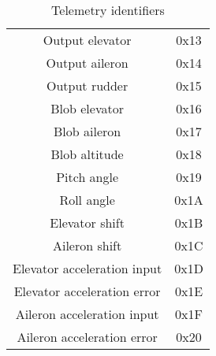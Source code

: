 \begin{table}[h]
\begin{center}
\begin{tabular}{c c}
 Output elevator & 0x13 \\  [0.5ex]  
 Output aileron & 0x14\\  [0.5ex] 
 Output rudder & 0x15\\  [0.5ex]  
 Blob elevator & 0x16 \\  [0.5ex]  
 Blob aileron & 0x17 \\  [0.5ex]  
 Blob altitude & 0x18\\  [0.5ex]  
 Pitch angle & 0x19\\  [0.5ex] 
 Roll angle & 0x1A\\  [0.5ex] 
 Elevator shift & 0x1B\\   [0.5ex]  
 Aileron shift & 0x1C\\  [0.5ex] 
 Elevator acceleration input & 0x1D\\ [0.5ex] 
 Elevator acceleration error & 0x1E \\  [0.5ex]  
 Aileron acceleration input & 0x1F\\    [0.5ex]  
 Aileron acceleration error & 0x20\\  [0.5ex] 
  \bottomrule
\end{tabular}
\end{center}
\caption{Telemetry identifiers}
\label{tab:telemetryIdentifiers}
\end{table}
